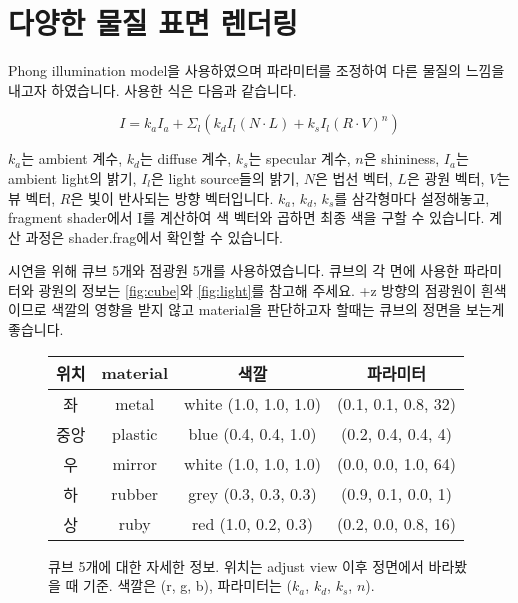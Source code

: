 \documentclass{article}
\begin{document}
\section{다양한 물질 표면 렌더링}

Phong illumination model을 사용하였으며 파라미터를 조정하여 다른 물질의 느낌을 내고자 하였습니다. 사용한 식은 다음과 같습니다.

\begin{equation*}
  I=k_aI_a+\Sigma_l\left(k_dI_l(N \cdot L)+k_sI_l(R \cdot V)^n\right)
\end{equation*}

$k_a$는 ambient 계수, $k_d$는 diffuse 계수, $k_s$는 specular 계수, $n$은 shininess, $I_a$는 ambient light의 밝기, $I_l$은 light source들의 밝기, $N$은 법선 벡터, $L$은 광원 벡터, $V$는 뷰 벡터, $R$은 빛이 반사되는 방향 벡터입니다.
$k_a$, $k_d$, $k_s$를 삼각형마다 설정해놓고, fragment shader에서 I를 계산하여 색 벡터와 곱하면 최종 색을 구할 수 있습니다.
계산 과정은 shader.frag에서 확인할 수 있습니다.

시연을 위해 큐브 5개와 점광원 5개를 사용하였습니다.
큐브의 각 면에 사용한 파라미터와 광원의 정보는 \autoref{fig:cube}와 \autoref{fig:light}를 참고해 주세요.
+z 방향의 점광원이 흰색이므로 색깔의 영향을 받지 않고 material을 판단하고자 할때는 큐브의 정면을 보는게 좋습니다.

\begin{figure}[ht]
  \centering
  \begin{tabular}{c c c c}
    위치 & material & 색깔 & 파라미터 \\
    \midrule
    좌 & metal & white (1.0, 1.0, 1.0) & (0.1, 0.1, 0.8, 32) \\
    중앙 & plastic & blue (0.4, 0.4, 1.0) & (0.2, 0.4, 0.4, 4) \\
    우 & mirror & white (1.0, 1.0, 1.0) & (0.0, 0.0, 1.0, 64) \\
    하 & rubber & grey (0.3, 0.3, 0.3) & (0.9, 0.1, 0.0, 1) \\
    상 & ruby & red (1.0, 0.2, 0.3) & (0.2, 0.0, 0.8, 16) \\
  \end{tabular}
  \caption{
    큐브 5개에 대한 자세한 정보.
    위치는 adjust view 이후 정면에서 바라봤을 때 기준.
    색깔은 (r, g, b), 파라미터는 ($k_a$, $k_d$, $k_s$, $n$).
    \label{fig:cube}
  }
\end{figure}
\end{document}
